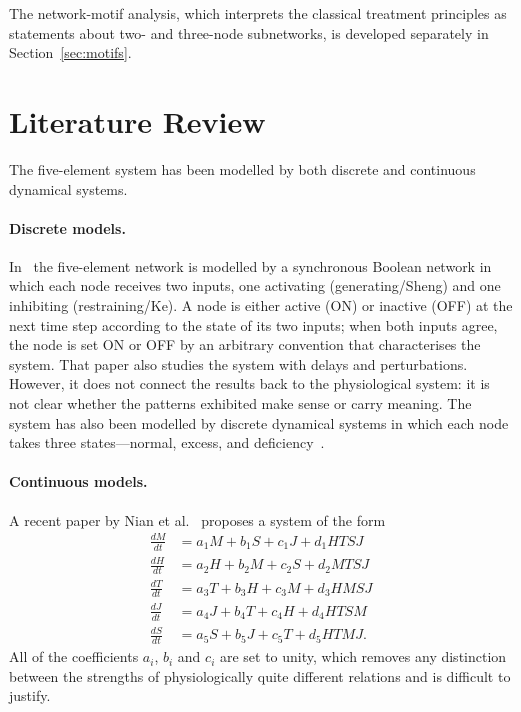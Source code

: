 \documentclass[11pt]{article}
\begin{document}
The network-motif analysis, which interprets the classical treatment principles
as statements about two- and three-node subnetworks, is developed separately in
Section~\ref{sec:motifs}.

\section{Literature Review}\label{sec:lit}

The five-element system has been modelled by both discrete and continuous
dynamical systems.

\paragraph{Discrete models.}
In~\cite{Bellavite1998} the five-element network is modelled by a synchronous
Boolean network in which each node receives two inputs, one activating
(generating/Sheng) and one inhibiting (restraining/Ke). A node is either active
(ON) or inactive (OFF) at the next time step according to the state of its two
inputs; when both inputs agree, the node is set ON or OFF by an arbitrary
convention that characterises the system. That paper also studies the system
with delays and perturbations. However, it does not connect the results back to
the physiological system: it is not clear whether the patterns exhibited make
sense or carry meaning. The system has also been modelled by discrete dynamical
systems in which each node takes three states---normal, excess, and
deficiency~\cite{Lin2020}.

\paragraph{Continuous models.}
A recent paper by Nian et al.~\cite{Nian2025} proposes a system of the form
\[
\begin{array}{rl}
\frac{dM}{dt} &= a_1 M + b_1 S+ c_1 J + d_1 HTSJ \\
\frac{dH}{dt} &= a_2 H + b_2 M+ c_2S   + d_2 MTSJ \\
\frac{dT}{dt} &= a_3 T + b_3 H+ c_3 M + d_3 HMSJ \\
\frac{dJ}{dt} &= a_4 J + b_4 T + c_4 H + d_4 HTSM \\
\frac{dS}{dt} &= a_5 S + b_5 J+ c_5 T + d_5 HTMJ .
\end{array}
\]
All of the coefficients $a_i$, $b_i$ and $c_i$ are set to unity, which removes
any distinction between the strengths of physiologically quite different
relations and is difficult to justify.
\end{document}
